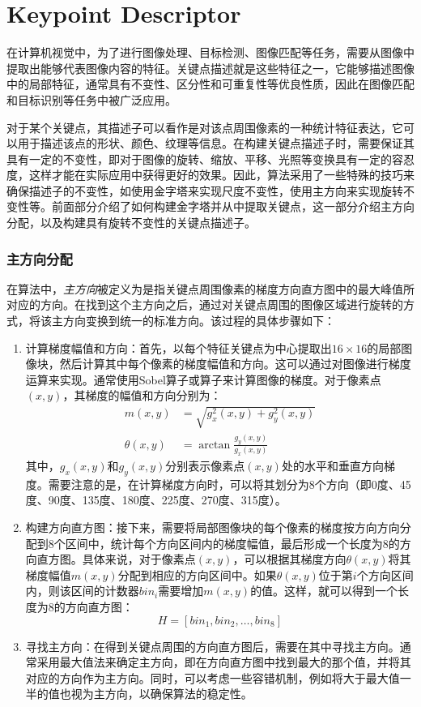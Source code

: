 \part{Keypoint Descriptor}\label{part:SIFT descriptor}

在计算机视觉中，为了进行图像处理、目标检测、图像匹配等任务，需要从图像中提取出能够代表图像内容的特征。关键点描述就是这些特征之一，它能够描述图像中的局部特征，通常具有不变性、区分性和可重复性等优良性质，因此在图像匹配和目标识别等任务中被广泛应用。

对于某个关键点，其描述子可以看作是对该点周围像素的一种统计特征表达，它可以用于描述该点的形状、颜色、纹理等信息。在构建关键点描述子时，需要保证其具有一定的不变性，即对于图像的旋转、缩放、平移、光照等变换具有一定的容忍度，这样才能在实际应用中获得更好的效果。因此，\sift 算法采用了一些特殊的技巧来确保描述子的不变性，如使用\DoG 金字塔来实现尺度不变性，使用主方向来实现旋转不变性等。前面部分介绍了如何构建\DoG 金字塔并从中提取关键点，这一部分介绍主方向分配，以及构建具有旋转不变性的关键点描述子。

\section{主方向分配}

在\sift 算法中，\emph{主方向}被定义为是指关键点周围像素的梯度方向直方图中的最大峰值所对应的方向。在找到这个主方向之后，通过对关键点周围的图像区域进行旋转的方式，将该主方向变换到统一的标准方向。该过程的具体步骤如下：
\begin{enumerate}
    \item 计算梯度幅值和方向：首先，以每个\sift 特征关键点为中心提取出$16\times 16$的局部图像块，然后计算其中每个像素的梯度幅值和方向。这可以通过对图像进行梯度运算来实现。通常使用Sobel算子或\lpl 算子来计算图像的梯度。对于像素点$(x,y)$，其梯度的幅值和方向分别为：
    \begin{align}
        m(x, y)&=\sqrt{g_x^2(x, y) + g_y^2(x, y)}\\
        \theta (x, y)&=\arctan \frac{g_y(x, y)}{g_x(x, y)}
        \label{equ: compute gradient}
    \end{align}
    其中，$g_x(x,y)$和$g_y(x,y)$分别表示像素点$(x,y)$处的水平和垂直方向梯度。需要注意的是，在计算梯度方向时，可以将其划分为8个方向（即0度、45度、90度、135度、180度、225度、270度、315度）。
    \item 构建方向直方图：接下来，需要将局部图像块的每个像素的梯度按方向方向分配到8个区间中，统计每个方向区间内的梯度幅值，最后形成一个长度为8的方向直方图。具体来说，对于像素点$(x,y)$，可以根据其梯度方向$\theta(x,y)$将其梯度幅值$m(x,y)$分配到相应的方向区间中。如果$\theta(x,y)$位于第$i$个方向区间内，则该区间的计数器$bin_i$需要增加$m(x,y)$的值。这样，就可以得到一个长度为8的方向直方图：
    \begin{equation*}
        H = \left[bin_1, bin_2, \ldots, bin_8\right]
    \end{equation*}
    \item 寻找主方向：在得到关键点周围的方向直方图后，需要在其中寻找主方向。通常采用最大值法来确定主方向，即在方向直方图中找到最大的那个值，并将其对应的方向作为主方向。同时，可以考虑一些容错机制，例如将大于最大值一半的值也视为主方向，以确保算法的稳定性。
\end{enumerate}


